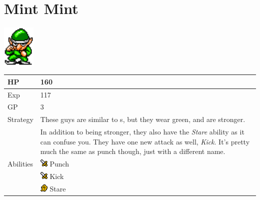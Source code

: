 \section{Mint Mint}
\label{monster:mint_mint}

\includegraphics[height=2cm,keepaspectratio]{./resources/monster/mint_mint}

\begin{longtable}{ l p{9cm} }
	HP
	& 160
\\ \hline
	Exp
	& 117
\\ \hline
	GP
	& 3
\\ \hline
	Strategy
	& These guys are similar to \nameref{monster:brownie}s, but they wear green, and are stronger. \\
	& In addition to being stronger, they also have the \textit{Stare} ability as it can confuse you. They have one new attack as well, \textit{Kick}. It's pretty much the same as punch though, just with a different name.
\\ \hline
	Abilities
	& \includegraphics[height=1em,keepaspectratio]{./resources/effects/damage} Punch \\
	& \includegraphics[height=1em,keepaspectratio]{./resources/effects/damage} Kick \\
	& \includegraphics[height=1em,keepaspectratio]{./resources/effects/confusion} Stare
\end{longtable}

